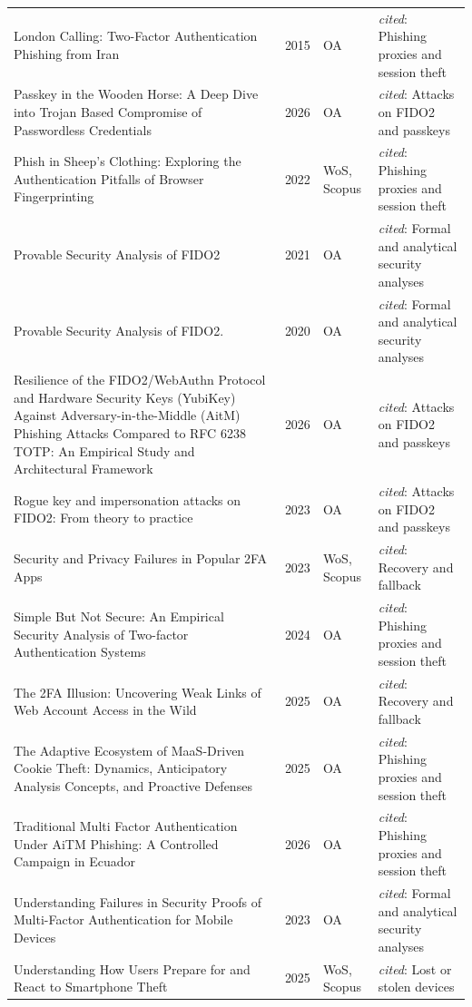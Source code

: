 \begin{longtable}{@{}%
  >{\raggedright\arraybackslash}p{}c%
  >{\raggedright\arraybackslash}p{}%
  >{\raggedright\arraybackslash}p{}@{}}
London Calling: Two-Factor Authentication Phishing from Iran & 2015 & OA & \emph{cited}: Phishing proxies and session theft \\
Passkey in the Wooden Horse: A Deep Dive into Trojan Based Compromise of Passwordless Credentials & 2026 & OA & \emph{cited}: Attacks on FIDO2 and passkeys \\
Phish in Sheep's Clothing: Exploring the Authentication Pitfalls of Browser Fingerprinting & 2022 & WoS, Scopus & \emph{cited}: Phishing proxies and session theft \\
Provable Security Analysis of FIDO2 & 2021 & OA & \emph{cited}: Formal and analytical security analyses \\
Provable Security Analysis of FIDO2. & 2020 & OA & \emph{cited}: Formal and analytical security analyses \\
Resilience of the FIDO2/WebAuthn Protocol and Hardware Security Keys (YubiKey) Against Adversary-in-the-Middle (AitM) Phishing Attacks Compared to RFC 6238 TOTP: An Empirical Study and Architectural Framework & 2026 & OA & \emph{cited}: Attacks on FIDO2 and passkeys \\
Rogue key and impersonation attacks on FIDO2: From theory to practice & 2023 & OA & \emph{cited}: Attacks on FIDO2 and passkeys \\
Security and Privacy Failures in Popular 2FA Apps & 2023 & WoS, Scopus & \emph{cited}: Recovery and fallback \\
Simple But Not Secure: An Empirical Security Analysis of Two-factor Authentication Systems & 2024 & OA & \emph{cited}: Phishing proxies and session theft \\
The 2FA Illusion: Uncovering Weak Links of Web Account Access in the Wild & 2025 & OA & \emph{cited}: Recovery and fallback \\
The Adaptive Ecosystem of MaaS-Driven Cookie Theft: Dynamics, Anticipatory Analysis Concepts, and Proactive Defenses & 2025 & OA & \emph{cited}: Phishing proxies and session theft \\
Traditional Multi Factor Authentication Under AiTM Phishing: A Controlled Campaign in Ecuador & 2026 & OA & \emph{cited}: Phishing proxies and session theft \\
Understanding Failures in Security Proofs of Multi-Factor Authentication for Mobile Devices & 2023 & OA & \emph{cited}: Formal and analytical security analyses \\
Understanding How Users Prepare for and React to Smartphone Theft & 2025 & WoS, Scopus & \emph{cited}: Lost or stolen devices \\

\end{longtable}

